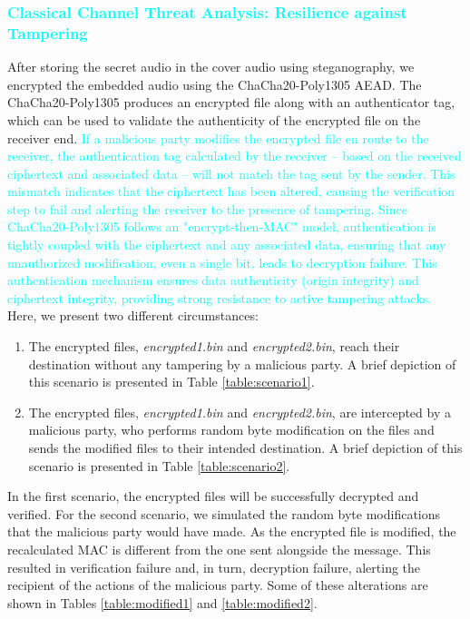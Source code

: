 \documentclass[a4paper]{cas-sc}
\begin{document}
\subsubsection{\textcolor{cyan}{Classical Channel Threat Analysis: Resilience against Tampering}}
After storing the secret audio in the cover audio using steganography, we encrypted the embedded audio using the ChaCha20-Poly1305 AEAD. The ChaCha20-Poly1305 produces an encrypted file along with an authenticator tag, which can be used to validate the authenticity of the encrypted file on the receiver end. \textcolor{cyan}{If a malicious party modifies the encrypted file en route to the receiver, the authentication tag calculated by the receiver -- based on the received ciphertext and associated data -- will not match the tag sent by the sender. This mismatch indicates that the ciphertext has been altered, causing the verification step to fail and alerting the receiver to the presence of tampering. Since ChaCha20-Poly1305 follows an "encrypt-then-MAC" model, authentication is tightly coupled with the ciphertext and any associated data, ensuring that any unauthorized modification, even a single bit, leads to decryption failure. This authentication mechanism ensures data authenticity (origin integrity) and ciphertext integrity, providing strong resistance to active tampering attacks.} Here, we present two different circumstances:
\begin{enumerate}
    \item The encrypted files, \textit{encrypted1.bin} and \textit{encrypted2.bin}, reach their destination without any tampering by a malicious party. A brief depiction of this scenario is presented in Table \ref{table:scenario1}.
    \item The encrypted files, \textit{encrypted1.bin} and \textit{encrypted2.bin}, are intercepted by a malicious party, who performs random byte modification on the files and sends the modified files to their intended destination. A brief depiction of this scenario is presented in Table \ref{table:scenario2}.
\end{enumerate}

In the first scenario, the encrypted files will be successfully decrypted and verified. For the second scenario, we simulated the random byte modifications that the malicious party would have made. As the encrypted file is modified, the recalculated MAC is different from the one sent alongside the message. This resulted in verification failure and, in turn, decryption failure, alerting the recipient of the actions of the malicious party. Some of these alterations are shown in Tables \ref{table:modified1} and \ref{table:modified2}.
\end{document}
